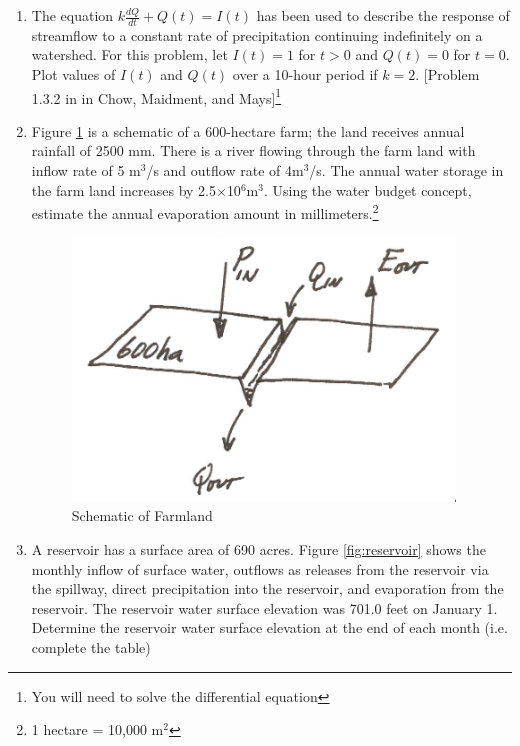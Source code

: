 \documentclass[12pt]{article}
\begin{document}
\begin{enumerate}
\item The equation $k\frac{dQ}{dt} + Q(t) = I(t)$ has been used to describe the response of streamflow to a constant rate of precipitation continuing indefinitely on a watershed.  For this problem, let $I(t) =1$ for $t>0$ and $Q(t) =0$ for $t=0$. Plot values of $I(t)$ and $Q(t)$ over a 10-hour period if $k=2$.  [Problem 1.3.2 in in Chow, Maidment, and Mays]\footnote{You will need to solve the differential equation}

\clearpage
 
 
%
 
\item Figure \ref{fig:farmland} is a schematic of a 600-hectare farm; the land receives annual rainfall of 2500 mm.  There is a river flowing through the farm land with inflow rate of 5 m$^3$/s and outflow rate of 4m$^3$/s.  The annual water storage in the farm land increases by 2.5$\times$10$^6$m$^3$.  Using the water budget concept, estimate the annual evaporation amount in millimeters.\footnote{1 hectare = 10,000 m$^2$}

\begin{figure}[h!] %
   \centering
   \includegraphics[width=4in]{farmland.png} 
   \caption{Schematic of Farmland}
   \label{fig:farmland}
\end{figure}

\item A reservoir has a surface area of 690 acres.  Figure \ref{fig:reservoir} shows the monthly inflow of surface water, outflows as releases from the reservoir via the spillway, direct precipitation into the reservoir, and evaporation from the reservoir.  The reservoir water surface elevation was 701.0 feet on January 1.  Determine the reservoir water surface elevation at the end of each month (i.e. complete the table)


\end{enumerate}
\end{document}
